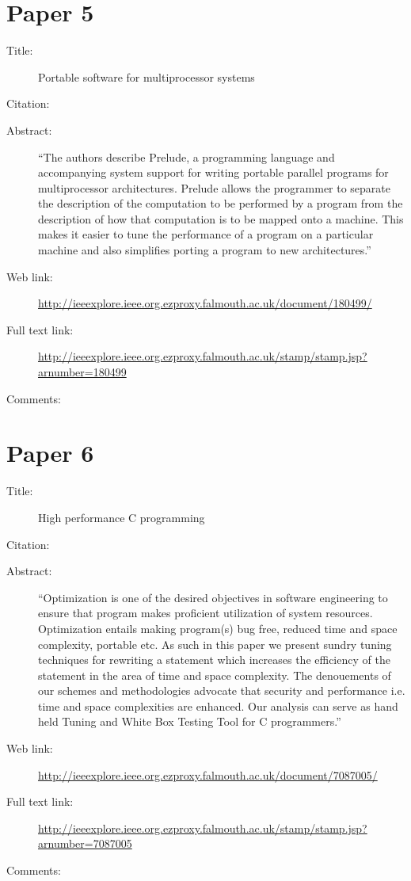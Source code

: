 \documentclass{scrartcl}
\begin{document}
\section*{Paper 5}
\begin{description}
\item[Title:] Portable software for multiprocessor systems
\item[Citation:] \cite{Colbrook}
\item[Abstract:] ``The authors describe Prelude, a programming language and accompanying system support for writing portable parallel programs for multiprocessor architectures. Prelude allows the programmer to separate the description of the computation to be performed by a program from the description of how that computation is to be mapped onto a machine. This makes it easier to tune the performance of a program on a particular machine and also simplifies porting a program to new architectures.''
\item[Web link:] \url{http://ieeexplore.ieee.org.ezproxy.falmouth.ac.uk/document/180499/}
\item[Full text link:]  \url{http://ieeexplore.ieee.org.ezproxy.falmouth.ac.uk/stamp/stamp.jsp?arnumber=180499}
\item[Comments:]
\end{description}

\section*{Paper 6}
\begin{description}
\item[Title:] High performance C programming
\item[Citation:] \cite{Myalapalli}
\item[Abstract:] ``Optimization is one of the desired objectives in software engineering to ensure that program makes proficient utilization of system resources. Optimization entails making program(s) bug free, reduced time and space complexity, portable etc. As such in this paper we present sundry tuning techniques for rewriting a statement which increases the efficiency of the statement in the area of time and space complexity. The denouements of our schemes and methodologies advocate that security and performance i.e. time and space complexities are enhanced. Our analysis can serve as hand held Tuning and White Box Testing Tool for C programmers.''
\item[Web link:] \url{http://ieeexplore.ieee.org.ezproxy.falmouth.ac.uk/document/7087005/}
\item[Full text link:]  \url{http://ieeexplore.ieee.org.ezproxy.falmouth.ac.uk/stamp/stamp.jsp?arnumber=7087005}
\item[Comments:]
\end{description}
\end{document}
